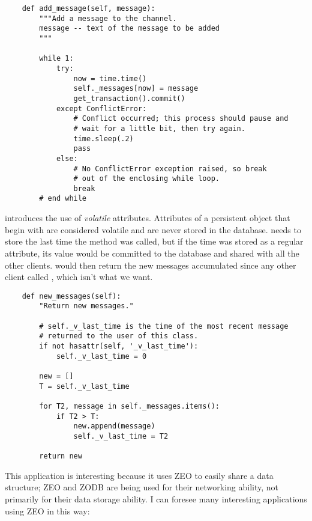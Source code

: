 \begin{verbatim}
    def add_message(self, message):
        """Add a message to the channel.
        message -- text of the message to be added
        """

        while 1:
            try:
                now = time.time()
                self._messages[now] = message
                get_transaction().commit()
            except ConflictError:
                # Conflict occurred; this process should pause and
                # wait for a little bit, then try again.
                time.sleep(.2)
                pass
            else:
                # No ConflictError exception raised, so break
                # out of the enclosing while loop.
                break
        # end while
\end{verbatim}

 introduces the use of \textit{volatile}
attributes.  Attributes of a persistent object that begin with
 are considered volatile and are never stored in the
database.   needs to store the last time
the method was called, but if the time was stored as a regular
attribute, its value would be committed to the database and shared
with all the other clients.   would then
return the new messages accumulated since any other client called
, which isn't what we want.

\begin{verbatim}
    def new_messages(self):
        "Return new messages."

        # self._v_last_time is the time of the most recent message
        # returned to the user of this class. 
        if not hasattr(self, '_v_last_time'):
            self._v_last_time = 0

        new = []
        T = self._v_last_time

        for T2, message in self._messages.items():
            if T2 > T:
                new.append(message)
                self._v_last_time = T2

        return new
\end{verbatim}

This application is interesting because it uses ZEO to easily share a
data structure; ZEO and ZODB are being used for their networking
ability, not primarily for their data storage ability.  I can foresee
many interesting applications using ZEO in this way:

